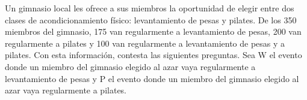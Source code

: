 Un gimnasio local les ofrece a sus miembros la oportunidad de elegir entre dos clases de
acondicionamiento físico: levantamiento de pesas y pilates. De los 350 miembros del gimnasio, 175 van regularmente
a levantamiento de pesas, 200 van regularmente a pilates y 100 van regularmente a levantamiento de pesas
y a pilates. Con esta información, contesta las siguientes preguntas.
Sea W el evento donde un miembro del gimnasio elegido al azar vaya regularmente a levantamiento de pesas y P
el evento donde un miembro del gimnasio elegido al azar vaya regularmente a pilates.
